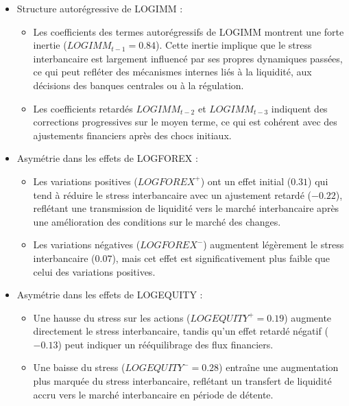 \begin{itemize}
    \item Structure autorégressive de LOGIMM :
    \begin{itemize}
        \item Les coefficients des termes autorégressifs de LOGIMM montrent une forte inertie (\(LOGIMM_{t-1} = 0.84\)). Cette inertie implique que le stress interbancaire est largement influencé par ses propres dynamiques passées, ce qui peut refléter des mécanismes internes liés à la liquidité, aux décisions des banques centrales ou à la régulation.
        \item Les coefficients retardés \(LOGIMM_{t-2}\) et \(LOGIMM_{t-3}\) indiquent des corrections progressives sur le moyen terme, ce qui est cohérent avec des ajustements financiers après des chocs initiaux.
    \end{itemize}

    \item Asymétrie dans les effets de LOGFOREX :
    \begin{itemize}
        \item Les variations positives (\(LOGFOREX^{+}\)) ont un effet initial (\(0.31\)) qui tend à réduire le stress interbancaire avec un ajustement retardé (\(-0.22\)), reflétant une transmission de liquidité vers le marché interbancaire après une amélioration des conditions sur le marché des changes.
        \item Les variations négatives (\(LOGFOREX^{-}\)) augmentent légèrement le stress interbancaire (\(0.07\)), mais cet effet est significativement plus faible que celui des variations positives.
    \end{itemize}

    \item Asymétrie dans les effets de LOGEQUITY :
    \begin{itemize}
        \item Une hausse du stress sur les actions (\(LOGEQUITY^{+} = 0.19\)) augmente directement le stress interbancaire, tandis qu'un effet retardé négatif (\(-0.13\)) peut indiquer un rééquilibrage des flux financiers.
        \item Une baisse du stress (\(LOGEQUITY^{-} = 0.28\)) entraîne une augmentation plus marquée du stress interbancaire, reflétant un transfert de liquidité accru vers le marché interbancaire en période de détente.
    \end{itemize}
\end{itemize}

